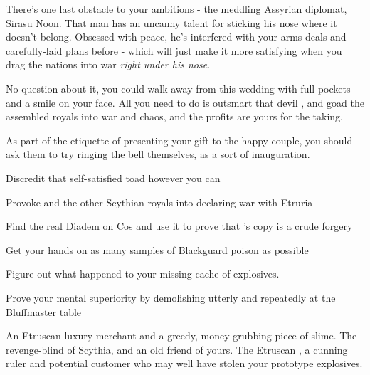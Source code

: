 \documentclass[char]{Kos}
\begin{document}
There's one last obstacle to your ambitions - the meddling Assyrian diplomat, Sirasu Noon. That man has an uncanny talent for sticking his nose where it doesn't belong. Obsessed with peace, he's interfered with your arms deals and carefully-laid plans before - which will just make it more satisfying when you drag the nations into war \emph{right under his nose}.

No question about it, you could walk away from this wedding with full pockets and a smile on your face. All you need to do is outsmart that devil \cMerchant{}, and goad the assembled royals into war and chaos, and the profits are yours for the taking.

\begin{itemz}[Notes]
  \item As part of the etiquette of presenting your gift to the happy couple, you should ask them to try ringing the bell themselves, as a sort of inauguration.
\end{itemz}

\begin{itemz}[Goals]
\item Discredit that self-satisfied toad \cMerchant{} however you can
\item Provoke \cScythiaQueen{\Monarch} \cScythiaQueen{} and the other Scythian royals into declaring war with Etruria
\item Find the real Diadem on Cos and use it to prove that \cMerchant{}'s copy is a crude forgery
\item Get your hands on as many samples of Blackguard poison as possible
\item Figure out what happened to your missing cache of explosives.
\item Prove your mental superiority by demolishing \cMerchant{} utterly and repeatedly at the Bluffmaster table
\end{itemz}

\begin{contacts}
\contact{\cMerchant{}} An Etruscan luxury merchant and a greedy, money-grubbing piece of slime.
\contact{\cScythiaQueen{}} The revenge-blind \cScythiaQueen{\monarch} of Scythia, and an old friend of yours.
\contact{\cEtruriaKing{}} The Etruscan \cEtruriaKing{\monarch}, a cunning ruler and potential customer who may well have stolen your prototype explosives.
\end{contacts}
\end{document}
